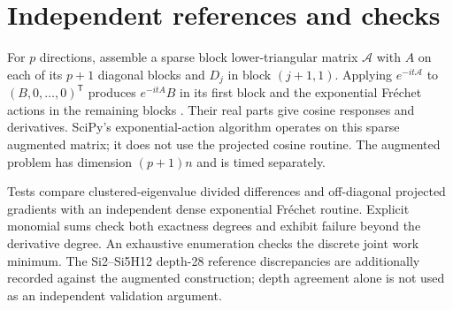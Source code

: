 \documentclass[10pt,letterpaper,twoside]{article}
\begin{document}
\section{Independent references and checks}\label{sec:reference}
For $p$ directions, assemble a sparse block lower-triangular matrix $\mathcal A$
with $A$ on each of its $p+1$ diagonal blocks and $D_j$ in block $(j+1,1)$.
Applying $e^{-it\mathcal A}$ to $(B,0,\ldots,0)^{\mathsf T}$ produces
$e^{-itA}B$ in its first block and the exponential Fr\'echet actions in the
remaining blocks \cite{vanloan1978,al-mohy2009}. Their real parts give cosine
responses and derivatives. SciPy's exponential-action algorithm operates on
this sparse augmented matrix; it does not use the projected cosine routine.
The augmented problem has dimension $(p+1)n$ and is timed separately.

Tests compare clustered-eigenvalue divided differences and off-diagonal
projected gradients with an independent dense exponential Fr\'echet routine.
Explicit monomial sums check both exactness degrees and exhibit failure beyond
the derivative degree. An exhaustive enumeration checks the discrete joint
work minimum. The Si2--Si5H12 depth-28 reference discrepancies are additionally
recorded against the augmented construction; depth agreement alone is not
used as an independent validation argument.
\FloatBarrier
\end{document}
